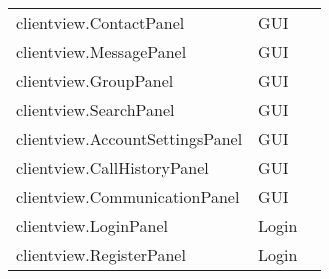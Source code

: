 \begin{center}
\begin{longtable}{lp{}l}
clientview.ContactPanel & GUI\\
clientview.MessagePanel & GUI\\
clientview.GroupPanel & GUI\\
clientview.SearchPanel & GUI\\
clientview.AccountSettingsPanel & GUI\\
clientview.CallHistoryPanel & GUI\\
clientview.CommunicationPanel & GUI\\
clientview.LoginPanel & Login\\
clientview.RegisterPanel & Login\\

\bottomrule
\end{longtable}
\end{center}
